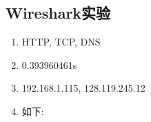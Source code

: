 ﻿\subsection*{Wireshark实验}

\begin{enumerate}
  \item HTTP, TCP, DNS
  \item 0.393960461s
  \item 192.168.1.115, 128.119.245.12
  \item 如下: 
\end{enumerate}